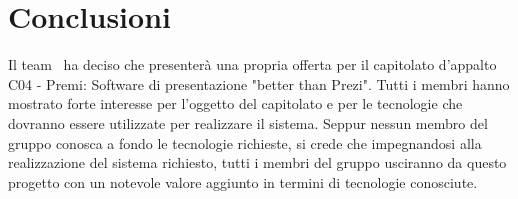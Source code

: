 \section{Conclusioni}
Il team \gruppo\ ha deciso che presenterà una propria offerta per il capitolato d'appalto C04 - Premi: Software di presentazione "better than Prezi". Tutti i membri hanno mostrato forte interesse per l'oggetto del capitolato e per le tecnologie che dovranno essere utilizzate per realizzare il sistema. Seppur nessun membro del gruppo conosca a fondo le tecnologie richieste, si crede che impegnandosi alla realizzazione del sistema richiesto, tutti i membri del gruppo usciranno da questo progetto con un notevole valore aggiunto in termini di tecnologie conosciute.